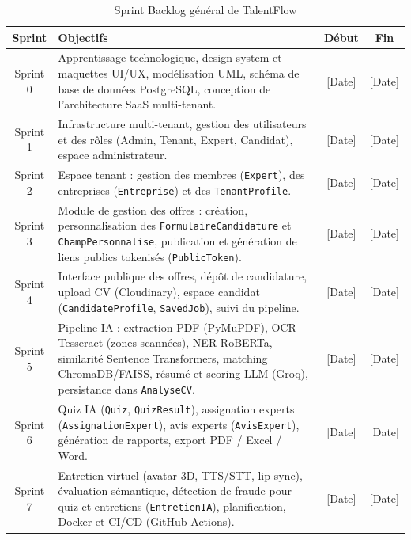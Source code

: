 \begin{table}[h]
\centering
\renewcommand{\arraystretch}{1.5}
\begin{tabular}{|c|p{9cm}|c|c|}
\hline
\textbf{Sprint} & \textbf{Objectifs} & \textbf{Début} & \textbf{Fin} \\
\hline
Sprint 0 & Apprentissage technologique, design system et maquettes UI/UX, modélisation
UML, schéma de base de données PostgreSQL, conception de l'architecture SaaS multi-tenant. & [Date] & [Date] \\
\hline
Sprint 1 & Infrastructure multi-tenant, gestion des utilisateurs et des rôles
(Admin, Tenant, Expert, Candidat), espace administrateur. & [Date] & [Date] \\
\hline
Sprint 2 & Espace tenant : gestion des membres (\texttt{Expert}), des entreprises
(\texttt{Entreprise}) et des \texttt{TenantProfile}. & [Date] & [Date] \\
\hline
Sprint 3 & Module de gestion des offres : création, personnalisation des
\texttt{FormulaireCandidature} et \texttt{ChampPersonnalise}, publication et
génération de liens publics tokenisés (\texttt{PublicToken}). & [Date] & [Date] \\
\hline
Sprint 4 & Interface publique des offres, dépôt de candidature, upload CV (Cloudinary),
espace candidat (\texttt{CandidateProfile}, \texttt{SavedJob}), suivi du pipeline. & [Date] & [Date] \\
\hline
Sprint 5 & Pipeline IA : extraction PDF (PyMuPDF), OCR Tesseract (zones scannées),
NER RoBERTa, similarité Sentence Transformers, matching ChromaDB/FAISS, résumé et
scoring LLM (Groq), persistance dans \texttt{AnalyseCV}. & [Date] & [Date] \\
\hline
Sprint 6 & Quiz IA (\texttt{Quiz}, \texttt{QuizResult}), assignation experts
(\texttt{AssignationExpert}), avis experts (\texttt{AvisExpert}), génération
de rapports, export PDF / Excel / Word. & [Date] & [Date] \\
\hline
Sprint 7 & Entretien virtuel (avatar 3D, TTS/STT, lip-sync), évaluation sémantique,
détection de fraude pour quiz et entretiens (\texttt{EntretienIA}),
planification, Docker et CI/CD (GitHub Actions). & [Date] & [Date] \\
\hline
\end{tabular}
\caption{Sprint Backlog général de TalentFlow}
\label{tab:sprints}
\end{table}


